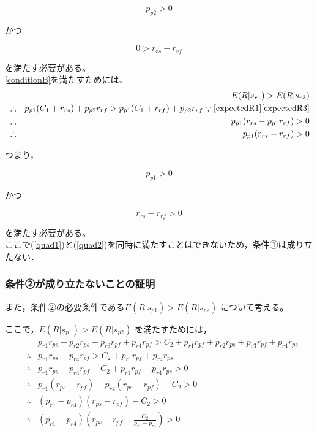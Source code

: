 \begin{equation}
  p_{p2} > 0 \nonumber
\end{equation}

かつ

\begin{equation}
\label{quad1}
  0 > r_{rs} - r_{rf}
\end{equation}

を満たす必要がある。\\


\eqref{conditionB}を満たすためには、
\begin{eqnarray*}
  &&E(R|s_{r1}) > E(R|s_{r3}) \\
  &\therefore& p_{p1}(C_1 + r_{rs}) + p_{p2}r_{rf} > p_{p1}(C_1 + r_{rf}) + p_{p2}r_{rf} \because\eqref{expectedR1}\eqref{expectedR3}\\
  &\therefore& p_{p1}(r_{rs} -  p_{p1} r_{rf}) > 0\\
  &\therefore& p_{p1} (r_{rs} - r_{rf}) > 0
\end{eqnarray*}

つまり，

\begin{equation}
   p_{p1} > 0 \nonumber
\end{equation}

かつ

\begin{equation}
   \label{quad2}
   r_{rs} - r_{rf} > 0
\end{equation}

を満たす必要がある。\\

ここで(\ref{quad1})と(\ref{quad2})を同時に満たすことはできないため，条件①は成り立たない．\\


\subsubsection{条件②が成り立たないことの証明}
また，条件②の必要条件である$E(R |s_{p1}) > E(R |s_{p2})$ について考える。

ここで，$E(R |s_{p1}) > E(R |s_{p2})$ を満たすためには，
\begin{eqnarray*}
  &&p_{r1} r_{ps} + p_{r2} r_{ps} + p_{r3} r_{pf} + p_{r4} r_{pf} > C_2 + p_{r1} r_{pf} + p_{r2} r_{ps} + p_{r3} r_{pf} + p_{r4} r_{ps} \\
  &\therefore& p_{r1} r_{ps} +  p_{r4} r_{pf} > C_2 + p_{r1} r_{pf} + p_{r4} r_{ps} \\
  &\therefore& p_{r1} r_{ps} +  p_{r4} r_{pf} - C_2 + p_{r1} r_{pf} - p_{r4} r_{ps} > 0 \\
  &\therefore& p_{r1}(r_{ps} - r_{pf}) - p_{r4}(r_{ps} - r_{pf} ) - C_2 > 0 \\
  &\therefore& (p_{r1} - p_{r4})(r_{ps} - r_{pf}) - C_2 > 0 \\
  &\therefore& (p_{r1} - p_{r4})(r_{ps} - r_{pf} - \frac{ C_2 }{p_{r1} - p_{r4}}) > 0
\end{eqnarray*}

